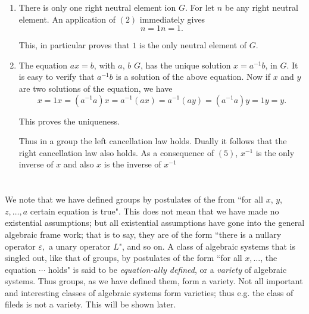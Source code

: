 \begin{enumerate}[(1)]
\begin{proof}
    Hence, $(x^{-1} x) 1=1$, 
    $$
    x^{-1} x = (x^{-1} x) 1=1.
    $$

    This proves (3).
  \end{proof}
  
  We say that $i$ is a (two-sided) neutral element or unit element, now
  that it is both left neutral and right neutral. Similarly $x^{-1}$ is
  an inverse of $x$. 
  
  
\item There is only one right neutral element ion $G$. For let $n$ be
  any right neutral element. An application of $(2)$ immediately gives 
  $$
  n = 1n = 1.
  $$
  
  This, in particular proves that $1$ is the only neutral element of $G$.
  
\item The equation $ax = b$, with $a$, $b$ $G$, has the unique
  solution $x = a^{-1}b$, in $G$. It is easy to verify that $a^{-1}b$
  is a solution of the above equation. Now if $x$ and $y$ are two
  solutions of the equation, we have 
  $$
  x = 1x = (a^{-1}a) x = a^{-1} (ax) = a^{-1} (ay) = (a^{-1} a)y = 1y = y.
  $$

  This proves the uniqueness. 
  
  Thus in a group the left cancellation law holds. Dually it follows
  that the right cancellation law also holds. As a consequence of
  $(5)$, $x^{-1}$ is the only inverse of $x$ and also $x$ is the
  inverse of $x^{-1}$ 
\end{enumerate}

\section{} %

We note that we have defined groups by postulates of the from ``for
all $x$, $y$, $z,\ldots, a$ certain equation is true". This does not
mean that we have made no existential assumptions; but all existential
assumptions have gone into the general algebraic frame work; that is
to say, they are of the form  ``there is a nullary operator
$\varepsilon, $ a unary operator $L$", and so on. A class of algebraic
systems that is singled out, like that of groups, by postulates of the
form ``for all $x,\ldots$,  the equation $\cdots$ holds" is said to be
\textit{equation-ally defined}, or a \textit{variety} of algebraic
systems. Thus groups, as we have defined them, form a variety. Not all
important and interesting classes of algebraic systems form varieties;
thus e.g. the class of fileds is not a variety. This will be shown
later. 

